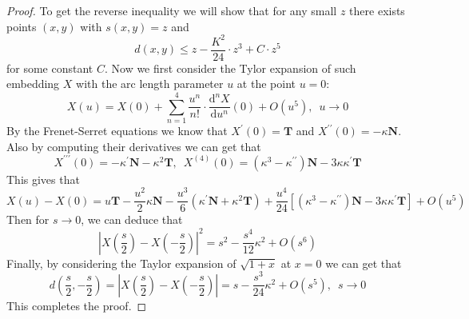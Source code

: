 \begin{proof}
    To get the reverse inequality we will show that for any small $z$ there exists points $(x,y)$ with $s(x,y)=z$ and
    \begin{equation*}
        d(x,y)\le z-\frac{K^2}{24}\cdot z^3+ C\cdot z^5
    \end{equation*}
    for some constant $C$. Now we first consider the Tylor expansion of such embedding $X$ with the arc length parameter $u$ at the point $u=0$:
    \begin{equation*}
        X(u)=X(0)+\sum_{n=1}^{4}\frac{u^n}{n!}\cdot\frac{\mathrm{d}^n X}{\mathrm{d}u^n}(0)+O(u^5),\,\,\, u\to 0
    \end{equation*}
    By the Frenet-Serret equations we know that $X^\prime (0)=\mathbf{T}$ and $X^{\prime\prime}(0)=-\kappa\mathbf{N}$. Also by computing their derivatives we can get that
    \begin{equation*}
        X^{\prime\prime\prime}(0)=-\kappa^\prime\mathbf{N}-\kappa^2\mathbf{T},\,\,\, X^{(4)}(0)=\left(\kappa^3-\kappa^{\prime\prime}\right)\mathbf{N}-3\kappa\kappa^\prime\mathbf{T}
    \end{equation*}
    This gives that
    \begin{equation*}
        X(u)-X(0)=u\mathbf{T}-\frac{u^2}{2}\kappa\mathbf{N}-\frac{u^3}{6}\left(\kappa^\prime\mathbf{N}+\kappa^2\mathbf{T}\right)+\frac{u^4}{24}\left[\left(\kappa^3-\kappa^{\prime\prime}\right)\mathbf{N}-3\kappa\kappa^\prime\mathbf{T}\right]+O(u^5)
    \end{equation*}
    Then for $s\to 0$, we can deduce that
    \begin{equation*}
        {\left|X\left(\frac{s}{2}\right)-X\left(-\frac{s}{2}\right)\right|}^2=s^2-\frac{s^4}{12}\kappa^2+O(s^6)
    \end{equation*}
    Finally, by considering the Taylor expansion of $\sqrt{1+x}$ at $x=0$ we can get that
    \begin{equation*}
        d\left(\frac{s}{2},-\frac{s}{2}\right)=\left|X\left(\frac{s}{2}\right)-X\left(-\frac{s}{2}\right)\right|=s-\frac{s^3}{24}\kappa^2+O(s^5),\,\,\, s\to 0
    \end{equation*}
    This completes the proof.
\end{proof}

